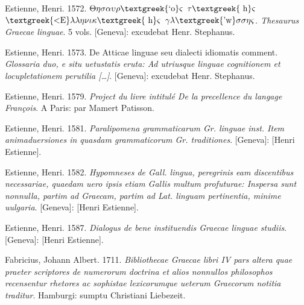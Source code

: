 \begin{styleStandard}
Estienne, Henri. 1572. \textit{$\Theta \eta \sigma \alpha \upsilon \rho \text{\textgreek{`o}}\varsigma $ $\tau \text{\textgreek{~h}}\varsigma $ $\text{\textgreek{<E}}\lambda \lambda \eta \nu \iota \kappa \text{\textgreek{~h}}\varsigma $ $\gamma \lambda \text{\textgreek{'w}}\sigma \sigma \eta \varsigma $. Thesaurus Graecae linguae}. 5 vols. [Geneva]: excudebat Henr. Stephanus.
\end{styleStandard}

\begin{styleStandard}
Estienne, Henri. 1573. De Atticae linguae seu dialecti idiomatis comment. \textit{Glossaria duo, e situ uetustatis eruta: Ad utriusque linguae cognitionem et locupletationem perutilia […]}. [Geneva]: excudebat Henr. Stephanus.
\end{styleStandard}

\begin{styleStandard}
Estienne, Henri. 1579. \textit{Project du livre intitulé De la precellence du langage François}. A Paris: par Mamert Patisson.
\end{styleStandard}

\begin{styleStandard}
Estienne, Henri. 1581. \textit{Paralipomena grammaticarum Gr. linguae inst. Item animaduersiones in quasdam grammaticorum Gr. traditiones}. [Geneva]: [Henri Estienne].
\end{styleStandard}

\begin{styleStandard}
Estienne, Henri. 1582. \textit{Hypomneses de Gall. lingua, peregrinis eam discentibus necessariae, quaedam uero ipsis etiam Gallis multum profuturae: Inspersa sunt nonnulla, partim ad Graecam, partim ad Lat. linguam pertinentia, minime uulgaria}. [Geneva]: [Henri Estienne].
\end{styleStandard}

\begin{styleStandard}
Estienne, Henri. 1587. \textit{Dialogus de bene instituendis Graecae linguae studiis}. [Geneva]: [Henri Estienne].
\end{styleStandard}

\begin{styleStandard}
Fabricius, Johann Albert. 1711. \textit{Bibliothecae Graecae libri IV pars altera quae praeter scriptores de numerorum doctrina et alios nonnullos philosophos recensentur rhetores ac sophistae lexicorumque ueterum Graecorum notitia traditur}. Hamburgi: sumptu Christiani Liebezeit.
\end{styleStandard}


